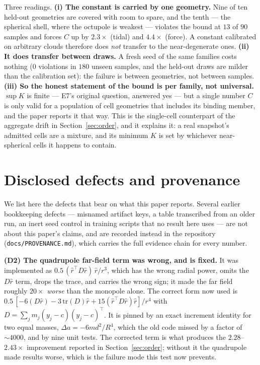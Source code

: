 \noindent Three readings. \textbf{(i) The constant is carried by one geometry.} Nine of ten held-out
geometries are covered with room to spare, and the tenth --- the spherical shell, where the octupole
is weakest --- violates the bound at $13$ of $90$ samples and forces $C$ up by $2.3\times$ (tidal) and
$4.4\times$ (force). A constant calibrated on arbitrary clouds therefore does \emph{not} transfer to
the near-degenerate ones. \textbf{(ii) It does transfer between draws.} A fresh seed of the same
families costs nothing ($0$ violations in $180$ unseen samples, and the held-out draws are milder than
the calibration set): the failure is between geometries, not between samples. \textbf{(iii) So the
honest statement of the bound is per family, not universal.} $\sup K$ is finite --- E7's original
question, answered yes --- but a single number $C$ is only valid for a population of cell geometries
that includes its binding member, and the paper reports it that way. This is the single-cell
counterpart of the aggregate drift in Section~\ref{sec:order}, and it explains it: a real snapshot's
admitted cells are a mixture, and its minimum $K$ is set by whichever near-spherical cells it happens
to contain.

\section{Disclosed defects and provenance}\label{app:provenance}
We list here the defects that bear on what this paper reports. Several earlier bookkeeping defects
--- misnamed artifact keys, a table transcribed from an older run, an inert seed control in training
scripts that no result here uses --- are not
about this paper's claims, and are recorded instead in the repository
(\texttt{docs/\allowbreak PROVENANCE.\allowbreak md}), which carries the full evidence chain for every number.

\noindent\textbf{(D2) The quadrupole far-field term was wrong, and is fixed.} It was implemented as
$0.5\,(\hat r^{\top}D\hat r)\,\hat r/r^{3}$, which has the wrong radial power, omits the $D\hat r$
term, drops the trace, and carries the wrong sign; it made the far field roughly $20\times$
\emph{worse} than the monopole alone. The correct form now used is
$0.5\,[-6(D\hat r)-3\,\mathrm{tr}(D)\hat r+15(\hat r^{\top}D\hat r)\hat r]/r^{4}$ with
$D=\sum_j m_j(y_j-c)(y_j-c)^{\top}$. It is pinned by an exact increment identity for two equal
masses, $\Delta a=-6md^{2}/R^{4}$, which the old code missed by a factor of $\sim4000$, and by nine
unit tests. The corrected term is what produces the $2.28$--$2.43\times$ improvement reported in
Section~\ref{sec:order}; without it the quadrupole made results worse, which is the failure mode this
test now prevents.

